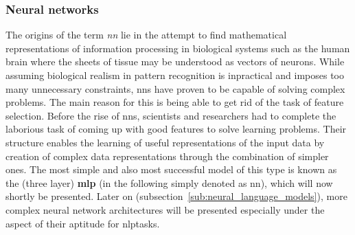 \subsubsection{Neural networks}
\label{sub:neural_networks}

The origins of the term \textit{\gls{nn}} lie in the attempt to find mathematical representations of information processing in biological systems such as the human brain where the sheets of tissue may be understood as vectors of neurons. While assuming biological realism in pattern recognition is inpractical and imposes too many unnecessary constraints, \gls{nn}s have proven to be capable of solving complex problems. The main reason for this is being able to get rid of the task of feature selection. Before the rise of \gls{nn}s, scientists and researchers had to complete the laborious task of coming up with good features to solve learning problems. Their structure enables the learning of useful representations of the input data by creation of complex data representations through the combination of simpler ones. The most simple and also most successful model of this type is known as the (three layer) \textbf{\gls{mlp}} (in the following simply denoted as \gls{nn}), which will now shortly be presented. Later on (subsection~\ref{sub:neural_language_models}), more complex neural network architectures will be presented especially under the aspect of their aptitude for \gls{nlp}tasks.

